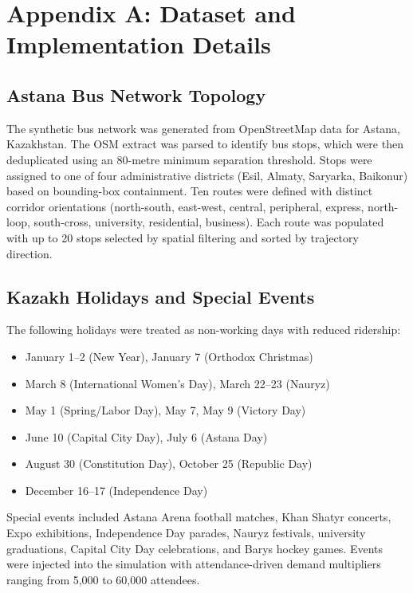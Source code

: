 %
%
\chapter{Appendix A: Dataset and Implementation Details}

\section{Astana Bus Network Topology}

The synthetic bus network was generated from OpenStreetMap data for Astana, Kazakhstan. The OSM extract was parsed to identify bus stops, which were then deduplicated using an 80-metre minimum separation threshold. Stops were assigned to one of four administrative districts (Esil, Almaty, Saryarka, Baikonur) based on bounding-box containment. Ten routes were defined with distinct corridor orientations (north-south, east-west, central, peripheral, express, north-loop, south-cross, university, residential, business). Each route was populated with up to 20 stops selected by spatial filtering and sorted by trajectory direction.

\section{Kazakh Holidays and Special Events}

The following holidays were treated as non-working days with reduced ridership:
\begin{itemize}
    \item January 1--2 (New Year), January 7 (Orthodox Christmas)
    \item March 8 (International Women's Day), March 22--23 (Nauryz)
    \item May 1 (Spring/Labor Day), May 7, May 9 (Victory Day)
    \item June 10 (Capital City Day), July 6 (Astana Day)
    \item August 30 (Constitution Day), October 25 (Republic Day)
    \item December 16--17 (Independence Day)
\end{itemize}

Special events included Astana Arena football matches, Khan Shatyr concerts, Expo exhibitions, Independence Day parades, Nauryz festivals, university graduations, Capital City Day celebrations, and Barys hockey games. Events were injected into the simulation with attendance-driven demand multipliers ranging from 5,000 to 60,000 attendees.

